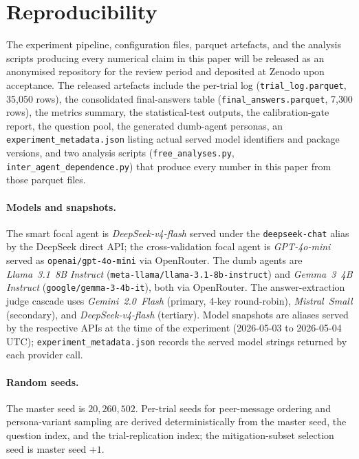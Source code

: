 \documentclass[review,3p,authoryear]{elsarticle}
\begin{document}
\section*{Reproducibility}
\label{sec:repro}

The experiment pipeline, configuration files, parquet artefacts, and
the analysis scripts producing every numerical claim in this paper
will be released as an anonymised repository for the review period and
deposited at Zenodo upon acceptance.
The released artefacts include the per-trial log
(\texttt{trial\_log.parquet}, 35{,}050 rows), the consolidated
final-answers table (\texttt{final\_answers.parquet}, 7{,}300 rows),
the metrics summary, the statistical-test outputs, the
calibration-gate report, the question pool, the generated dumb-agent
personas, an \texttt{experiment\_metadata.json} listing actual served
model identifiers and package versions, and two analysis scripts
(\texttt{free\_analyses.py},
\texttt{inter\_agent\_dependence.py}) that produce every number in
this paper from those parquet files.

\paragraph{Models and snapshots.}
The smart focal agent is \textit{DeepSeek-v4-flash} served under the
\texttt{deepseek-chat} alias by the DeepSeek direct API; the
cross-validation focal agent is \textit{GPT-4o-mini} served as
\texttt{openai/\allowbreak gpt-4o-mini} via OpenRouter.
The dumb agents are \textit{Llama~3.1~8B Instruct}
(\texttt{meta-llama/\allowbreak llama-3.1-8b-instruct}) and
\textit{Gemma~3~4B Instruct}
(\texttt{google/\allowbreak gemma-3-4b-it}), both via OpenRouter.
The answer-extraction judge cascade uses \textit{Gemini~2.0~Flash}
(primary, 4-key round-robin), \textit{Mistral~Small} (secondary),
and \textit{DeepSeek-v4-flash} (tertiary).
Model snapshots are aliases served by the respective APIs at the
time of the experiment (2026-05-03 to 2026-05-04 UTC);
\texttt{experiment\_metadata.json} records the served model strings
returned by each provider call.

\paragraph{Random seeds.}
The master seed is $20{,}260{,}502$.
Per-trial seeds for peer-message ordering and persona-variant sampling
are derived deterministically from the master seed, the question
index, and the trial-replication index; the mitigation-subset
selection seed is master seed $+1$.
\end{document}
